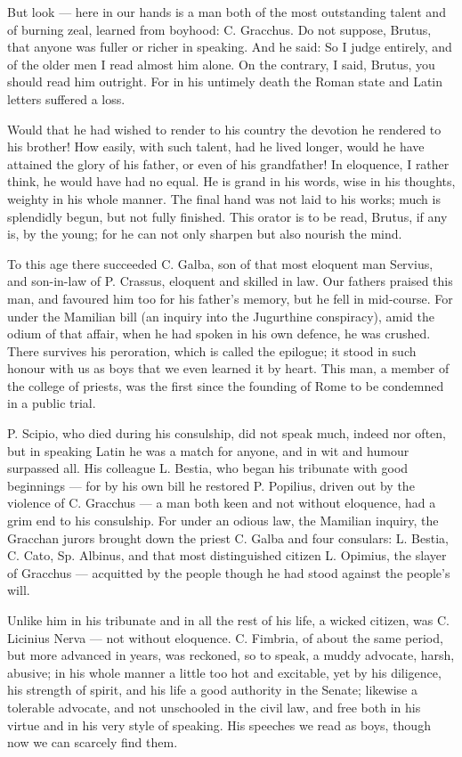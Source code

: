  But look — here in our hands is a man both of the most outstanding talent and of burning zeal, learned from boyhood: C. Gracchus. Do not suppose, Brutus, that anyone was fuller or richer in speaking. And he said: So I judge entirely, and of the older men I read almost him alone. On the contrary, I said, Brutus, you should read him outright. For in his untimely death the Roman state and Latin letters suffered a loss.

 Would that he had wished to render to his country the devotion he rendered to his brother! How easily, with such talent, had he lived longer, would he have attained the glory of his father, or even of his grandfather! In eloquence, I rather think, he would have had no equal. He is grand in his words, wise in his thoughts, weighty in his whole manner. The final hand was not laid to his works; much is splendidly begun, but not fully finished. This orator is to be read, Brutus, if any is, by the young; for he can not only sharpen but also nourish the mind.

 To this age there succeeded C. Galba, son of that most eloquent man Servius, and son-in-law of P. Crassus, eloquent and skilled in law. Our fathers praised this man, and favoured him too for his father's memory, but he fell in mid-course. For under the Mamilian bill (an inquiry into the Jugurthine conspiracy), amid the odium of that affair, when he had spoken in his own defence, he was crushed. There survives his peroration, which is called the epilogue; it stood in such honour with us as boys that we even learned it by heart. This man, a member of the college of priests, was the first since the founding of Rome to be condemned in a public trial.

 P. Scipio, who died during his consulship, did not speak much, indeed nor often, but in speaking Latin he was a match for anyone, and in wit and humour surpassed all. His colleague L. Bestia, who began his tribunate with good beginnings — for by his own bill he restored P. Popilius, driven out by the violence of C. Gracchus — a man both keen and not without eloquence, had a grim end to his consulship. For under an odious law, the Mamilian inquiry, the Gracchan jurors brought down the priest C. Galba and four consulars: L. Bestia, C. Cato, Sp. Albinus, and that most distinguished citizen L. Opimius, the slayer of Gracchus — acquitted by the people though he had stood against the people's will.

 Unlike him in his tribunate and in all the rest of his life, a wicked citizen, was C. Licinius Nerva — not without eloquence. C. Fimbria, of about the same period, but more advanced in years, was reckoned, so to speak, a muddy advocate, harsh, abusive; in his whole manner a little too hot and excitable, yet by his diligence, his strength of spirit, and his life a good authority in the Senate; likewise a tolerable advocate, and not unschooled in the civil law, and free both in his virtue and in his very style of speaking. His speeches we read as boys, though now we can scarcely find them.

